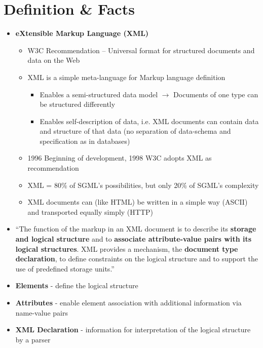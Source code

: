 \documentclass[11pt]{article}
\begin{document}
\section{Definition \& Facts}
\label{sec:org7b5ca9a}
\begin{itemize}
\item \textbf{eXtensible Markup Language (XML)}
\begin{itemize}
\item W3C Recommendation – Universal format for structured documents and data on the Web
\item XML is a simple meta-language for Markup language definition
\begin{itemize}
\item Enables a semi-structured data model \(\rightarrow\) Documents of one type can be structured differently
\item Enables self-description of data, i.e. XML documents can contain data and structure of that data (no separation of data-schema and specification as in databases)
\end{itemize}
\item 1996 Beginning of development, 1998 W3C adopts XML as recommendation
\item XML = 80\% of SGML’s possibilities, but only 20\% of SGML’s complexity
\item XML documents can (like HTML) be written in a simple way (ASCII) and transported equally simply (HTTP)
\end{itemize}
\item “The function of the markup in an XML document is to describe its \textbf{storage and logical structure} and to \textbf{associate attribute-value pairs with its logical structures}. XML provides a mechanism, the \textbf{document type declaration}, to define constraints on the logical structure and to support the use of predefined storage units.”
\item \textbf{Elements} - define the logical structure
\item \textbf{Attributes} - enable element association with additional information via name-value pairs
\item \textbf{XML Declaration} - information for interpretation of the logical structure by a parser
\end{itemize}
\end{document}
